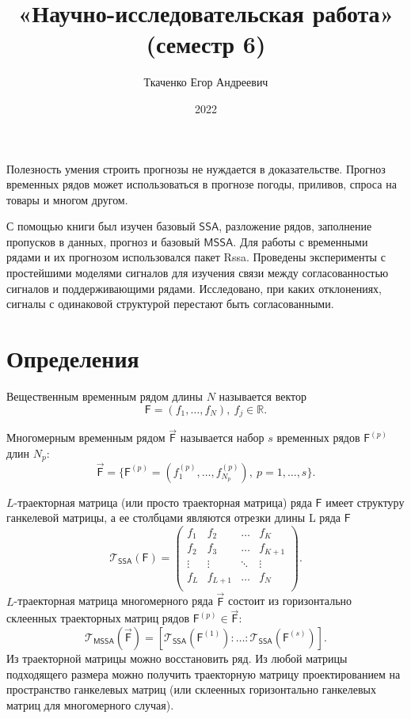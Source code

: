 \documentclass[specialist, substylefile = spbureport.rtx,
    subf,href,colorlinks=true, 12pt]{disser}
\title{«Научно-исследовательская работа» (семестр 6)}
\author{Ткаченко Егор Андреевич}
\date{2022}
\newcommand{\T}{\mathcal{T}}
\newcommand{\F}{\mathsf{F}}
\newcommand{\MF}{\vec{\F}}
\newcommand{\SSA}{\mathsf{SSA}}
\newcommand{\MSSA}{\mathsf{MSSA}}
\begin{document}
    \maketitle
    \pagebreak
    \tableofcontents
    \pagebreak

    \intro
        Полезность умения строить прогнозы не нуждается в доказательстве. Прогноз временных рядов может использоваться в прогнозе погоды, приливов, спроса на товары и многом другом.
         
        С помощью книги \cite{SSA_with_R} был изучен базовый $\SSA$, разложение рядов, заполнение пропусков в данных, прогноз и базовый $\MSSA$. Для работы с временными рядами и их прогнозом использовался пакет Rssa. Проведены эксперименты с простейшими моделями сигналов для изучения связи между согласованностью сигналов и поддерживающими рядами. 
        Исследовано, при каких отклонениях, сигналы с одинаковой структурой перестают быть согласованными.

    
    \section{Определения}
        Вещественным временным рядом длины $N$ называется вектор
        $$\F = (f_1, \dots, f_{N}),\ f_j \in \mathbb{R}.$$

        Многомерным временным рядом $\MF$ называется набор $s$ временных рядов $\F^{(p)}$ длин $N_p$:
        $$\MF = \{\F^{(p)} = (f^{(p)}_1, \dots, f^{(p)}_{N_p}),\ p=1, \dots, s\}.$$

        $L$-траекторная матрица (или просто траекторная матрица) ряда $\F$ имеет структуру ганкелевой матрицы, а ее столбцами являются отрезки длины L ряда $\F$
        $$\T_{\SSA}(\F) =
        \begin{pmatrix}
            f_1     & f_2    & \dots  & f_{K} \\
            f_2     & f_3    & \dots  & f_{K+1}     \\
            \vdots  & \vdots & \ddots & \vdots  \\
            f_{L} & f_{L+1}    & \dots  & f_{N} \\
        \end{pmatrix}.$$
        $L$-траекторная матрица многомерного ряда $\MF$ состоит из горизонтально склеенных траекторных матриц рядов $\F^{(p)} \in \MF$:
        $$\T_{\MSSA}(\MF) = [\T_{\SSA}(\F^{(1)}): \dotso :\T_{\SSA}(\F^{(s)})].$$
        Из траекторной матрицы можно восстановить ряд. Из любой матрицы подходящего размера можно получить траекторную матрицу проектированием на пространство ганкелевых матриц (или склеенных горизонтально ганкелевых матриц для многомерного случая).
\end{document}
